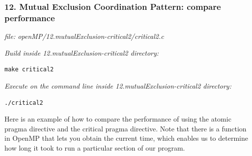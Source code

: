 \documentclass[letterpaper,10pt,openany,oneside]{sphinxmanual}
\begin{document}
\subsubsection{12.  Mutual Exclusion Coordination Pattern: compare performance}
\label{SharedMemory/MutualExclusion:mutual-exclusion-coordination-pattern-compare-performance}
\emph{file: openMP/12.mutualExclusion-critical2/critical2.c}

\emph{Build inside 12.mutualExclusion-critical2 directory:}

\begin{Verbatim}[commandchars=\\\{\}]
make critical2
\end{Verbatim}

\emph{Execute on the command line inside 12.mutualExclusion-critical2 directory:}

\begin{Verbatim}[commandchars=\\\{\}]
./critical2
\end{Verbatim}

Here is an example of how to compare the performance of using the atomic pragma directive and the critical pragma directive.  Note that there is a function in OpenMP that lets you obtain the current time, which enables us to determine how long it took to run a particular section of our program.
\end{document}
